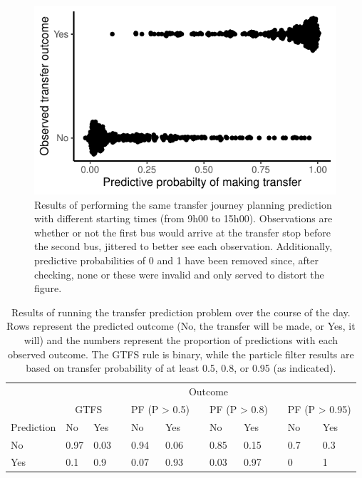\begin{knitrout}\small
{}\color{fgcolor}\begin{figure}

{\centering \includegraphics[width=.5\textwidth]{figure/eta_journey_transfer_many-1} 

}

\caption[Results of performing the same transfer journey planning prediction with different starting times (from  9h00 to 15h00)]{Results of performing the same transfer journey planning prediction with different starting times (from  9h00 to 15h00). Observations are whether or not the first bus would arrive at the transfer stop before the second bus, jittered to better see each observation. Additionally, predictive probabilities of 0 and 1 have been removed since, after checking, none or these were invalid and only served to distort the figure.}\label{fig:eta_journey_transfer_many}
\end{figure}

\begin{table}

\caption{\label{tab:eta_journey_transfer_many}Results of running the transfer prediction problem over the course of the day. Rows represent the predicted outcome (No, the transfer will be made, or Yes, it will) and the numbers represent the proportion of predictions with each observed outcome. The GTFS rule is binary, while the particle filter results are based on transfer probability of at least 0.5, 0.8, or 0.95 (as indicated).}
\centering
\fontsize{8}{10}\selectfont
\begin{tabular}[t]{llllllllllll}
\toprule
\multicolumn{1}{c}{} & \multicolumn{11}{c}{Outcome} \\
\cmidrule(l{3pt}r{3pt}){2-12}
\multicolumn{1}{c}{} & \multicolumn{2}{c}{GTFS} & \multicolumn{1}{c}{} & \multicolumn{2}{c}{PF (P > 0.5)} & \multicolumn{1}{c}{} & \multicolumn{2}{c}{PF (P > 0.8)} & \multicolumn{1}{c}{} & \multicolumn{2}{c}{PF (P > 0.95)} \\
\cmidrule(l{3pt}r{3pt}){2-3} \cmidrule(l{3pt}r{3pt}){5-6} \cmidrule(l{3pt}r{3pt}){8-9} \cmidrule(l{3pt}r{3pt}){11-12}
Prediction & No & Yes &  & No & Yes &  & No & Yes &  & No & Yes\\
\midrule
No & 0.97 & 0.03 &  & 0.94 & 0.06 &  & 0.85 & 0.15 &  & 0.7 & 0.3\\
Yes & 0.1 & 0.9 &  & 0.07 & 0.93 &  & 0.03 & 0.97 &  & 0 & 1\\
\bottomrule
\end{tabular}
\end{table}


\end{knitrout}



